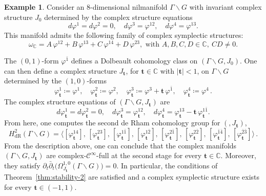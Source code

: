 \documentclass[a4paper]{amsart}
\theoremstyle{definition}
\newtheorem{example}[theorem]{Example}
\theoremstyle{remark}
\numberwithin{equation}{section}
\begin{document}
\begin{example}
Consider an $8$-dimensional nilmanifold $\Gamma\backslash G$ with invariant complex structure $J_0$ determined by the complex structure equations
\begin{equation*}
 d\varphi^1=d\varphi^2=0, \quad d\varphi^3=\varphi^{12}, \quad d\varphi^4=\varphi^{13}.
\end{equation*}
This manifold admits the following family of complex symplectic structures:
\begin{equation*}
\omega_{\mathbb C}=A\,\varphi^{12}+B\,\varphi^{13}+C\,\varphi^{14}+D\,\varphi^{23}, \text{ with }A,B,C,D\in\mathbb C, \ CD\neq 0.
\end{equation*}

The $(0,1)$-form $\varphi^{\bar1}$ defines a Dolbeault cohomology class on $(\Gamma\backslash G,J_0)$. One can then define a complex structure $J_\mathbf{t}$, for $\mathbf{t}\in\mathbb C$ with $|\mathbf{t}|<1$, on $\Gamma\backslash G$ determined by the $(1,0)$-forms
\begin{equation*}
\varphi_{\mathbf{t}}^1\coloneqq\varphi^1, \quad 
\varphi_{\mathbf{t}}^2\coloneqq\varphi^2,\quad
\varphi_{\mathbf{t}}^3\coloneqq\varphi^3+\mathbf{t}\,\varphi^{\bar1},\quad 
\varphi_{\mathbf{t}}^4\coloneqq\varphi^4\,.
\end{equation*}
The complex structure equations of $(\Gamma\backslash G,J_{\mathbf{t}})$ are
\begin{equation*}
d\varphi_{\mathbf{t}}^1=d\varphi_{\mathbf{t}}^2=0, \quad 
d\varphi_{\mathbf{t}}^3=\varphi_{\mathbf{t}}^{12}, \quad
d\varphi_{\mathbf{t}}^4=\varphi_{\mathbf{t}}^{13}
-{\mathbf{t}}\,\varphi_{\mathbf{t}}^{1\bar1}.
\end{equation*}
From here, one computes the second de Rham cohomology group for $(,J_{\mathbf{t}})$,
\[
H_{\text{dR}}^2(\Gamma\backslash G)=\langle 
[\varphi_{\mathbf{t}}^{14}],\,
[\varphi_{\mathbf{t}}^{23}],\,
[\varphi_{\mathbf{t}}^{1\bar 1}],\,
[\varphi_{\mathbf{t}}^{1\bar 2}], \,
[\varphi_{\mathbf{t}}^{2\bar 1}],\,
[\varphi_{\mathbf{t}}^{2\bar 2}],\,
[\varphi_{\mathbf{t}}^{\bar1\bar 4}],\,
[\varphi_{\mathbf{t}}^{\bar2\bar 3}]
\rangle\,.
\]
From the description above, one can conclude that the complex manifolds $(\Gamma\backslash G,J_{\mathbf{t}})$ are complex-$\mathcal C^\infty$-full at the second stage for every $\mathbf t\in\mathbb C$. Moreover, they satisfy $\partial_t\bar{\partial}_t\big(\Omega^{1,0}_{J_{\mathbf t}}(\Gamma\backslash G)\big)=0$. In particular, the conditions of Theorem~\ref{thm:stability-2} are satisfied and a complex symplectic structure exists for every $\mathbf t\in (-1,1)$.
\end{example}
\end{document}
